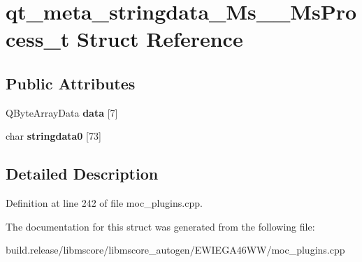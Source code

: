 \hypertarget{structqt__meta__stringdata___ms_____ms_process__t}{}\section{qt\+\_\+meta\+\_\+stringdata\+\_\+\+Ms\+\_\+\+\_\+\+Ms\+Process\+\_\+t Struct Reference}
\label{structqt__meta__stringdata___ms_____ms_process__t}
\subsection*{Public Attributes}
\begin{DoxyCompactItemize}
\item 
\mbox{\label{structqt__meta__stringdata___ms_____ms_process__t_a98273dafeca32320801052891904e171}} 
Q\+Byte\+Array\+Data {\bfseries data} \mbox{[}7\mbox{]}
\item 
\mbox{\label{structqt__meta__stringdata___ms_____ms_process__t_a125e765172a45f5c8dee40d71b8192dc}} 
char {\bfseries stringdata0} \mbox{[}73\mbox{]}
\end{DoxyCompactItemize}


\subsection{Detailed Description}


Definition at line 242 of file moc\+\_\+plugins.\+cpp.



The documentation for this struct was generated from the following file\+:\begin{DoxyCompactItemize}
\item 
build.\+release/libmscore/libmscore\+\_\+autogen/\+E\+W\+I\+E\+G\+A46\+W\+W/moc\+\_\+plugins.\+cpp\end{DoxyCompactItemize}
